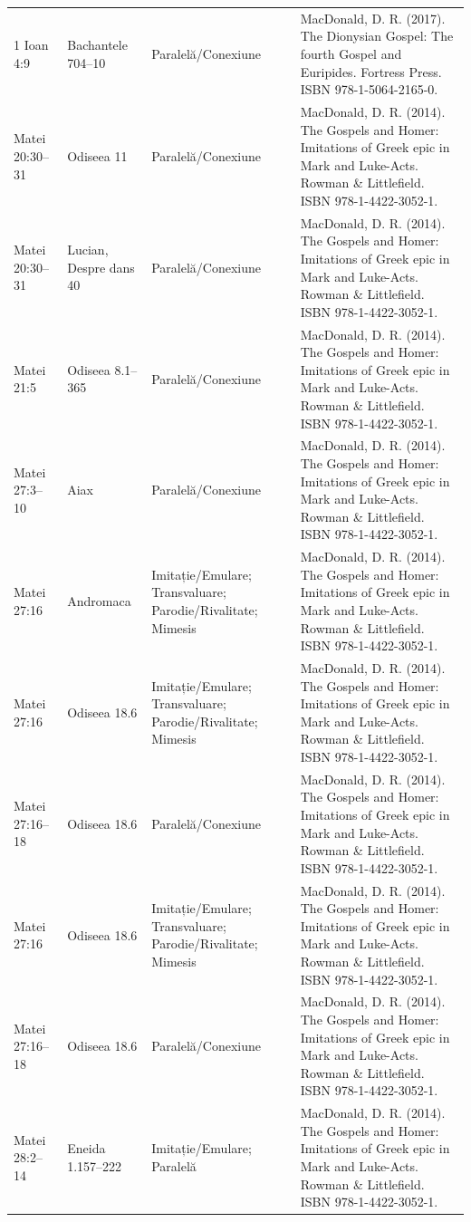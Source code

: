 \documentclass[12pt,a4paper,twoside,openany]{book}
\begin{document}
\begin{longtable}{L{1.4cm}L{1.7cm}L{3.1cm}L{8.4cm}}
1 Ioan 4:9 & Bachantele 704–10 & Paralelă/Conexiune & MacDonald, D. R. (2017). The Dionysian Gospel: The fourth Gospel and Euripides. Fortress Press. ISBN 978-1-5064-2165-0. \\
Matei 20:30–31 & Odiseea 11 & Paralelă/Conexiune & MacDonald, D. R. (2014). The Gospels and Homer: Imitations of Greek epic in Mark and Luke-Acts. Rowman \& Littlefield. ISBN 978-1-4422-3052-1. \\
Matei 20:30–31 & Lucian, Despre dans 40 & Paralelă/Conexiune & MacDonald, D. R. (2014). The Gospels and Homer: Imitations of Greek epic in Mark and Luke-Acts. Rowman \& Littlefield. ISBN 978-1-4422-3052-1. \\
Matei 21:5 & Odiseea 8.1–365 & Paralelă/Conexiune & MacDonald, D. R. (2014). The Gospels and Homer: Imitations of Greek epic in Mark and Luke-Acts. Rowman \& Littlefield. ISBN 978-1-4422-3052-1. \\
Matei 27:3–10 & Aiax & Paralelă/Conexiune & MacDonald, D. R. (2014). The Gospels and Homer: Imitations of Greek epic in Mark and Luke-Acts. Rowman \& Littlefield. ISBN 978-1-4422-3052-1. \\
Matei 27:16 & Andromaca & Imitație/Emulare; Transvaluare; Parodie/Rivalitate; Mimesis & MacDonald, D. R. (2014). The Gospels and Homer: Imitations of Greek epic in Mark and Luke-Acts. Rowman \& Littlefield. ISBN 978-1-4422-3052-1. \\
Matei 27:16 & Odiseea 18.6 & Imitație/Emulare; Transvaluare; Parodie/Rivalitate; Mimesis & MacDonald, D. R. (2014). The Gospels and Homer: Imitations of Greek epic in Mark and Luke-Acts. Rowman \& Littlefield. ISBN 978-1-4422-3052-1. \\
Matei 27:16–18 & Odiseea 18.6 & Paralelă/Conexiune & MacDonald, D. R. (2014). The Gospels and Homer: Imitations of Greek epic in Mark and Luke-Acts. Rowman \& Littlefield. ISBN 978-1-4422-3052-1. \\
Matei 27:16 & Odiseea 18.6 & Imitație/Emulare; Transvaluare; Parodie/Rivalitate; Mimesis & MacDonald, D. R. (2014). The Gospels and Homer: Imitations of Greek epic in Mark and Luke-Acts. Rowman \& Littlefield. ISBN 978-1-4422-3052-1. \\
Matei 27:16–18 & Odiseea 18.6 & Paralelă/Conexiune & MacDonald, D. R. (2014). The Gospels and Homer: Imitations of Greek epic in Mark and Luke-Acts. Rowman \& Littlefield. ISBN 978-1-4422-3052-1. \\
Matei 28:2–14 & Eneida 1.157–222 & Imitație/Emulare; Paralelă & MacDonald, D. R. (2014). The Gospels and Homer: Imitations of Greek epic in Mark and Luke-Acts. Rowman \& Littlefield. ISBN 978-1-4422-3052-1. \\

\end{longtable}
\end{document}
